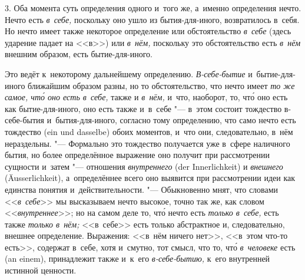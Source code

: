 3. Оба момента суть определения одного и~того же, а~именно определения
нечто. Нечто есть {\em в~себе,} поскольку оно ушло из
бытия-для-иного, возвратилось в~себя. Но нечто имеет также некоторое
определение или обстоятельство {\em в~себе} (здесь
ударение падает на <<в>>) или {\em в~нём,} поскольку это
обстоятельство есть {\em в~нём} внешним образом, есть
бытие-для-иного.

Это ведёт к~некоторому дальнейшему определению.
{\em В-себе-бытие} и~бытие-для-иного ближайшим
образом разны, но то обстоятельство, что нечто имеет
{\em то же самое, чт\'{о} оно есть в~себе,} также и {\em в~нём,} и~что,
наоборот, то,
чт\'{о} оно есть как бытие-для-иного, оно есть также и~в~себе "--- в~этом
состоит тождество в-себе-бытия и~бытия-для-иного, согласно тому
определению, что само нечто есть тождество (ein und dasselbe) обоих
моментов, и~что они, следовательно, в~нём нераздельны. "--- Формально это
тождество получается уже в~сфере наличного бытия, но более определённое
выражение оно получит при рассмотрении сущности и~затем "--- отношения
{\em внутреннего} (der Inner\-lich\-keit) и
{\em внешнего} (Äusser\-lich\-keit), а~определённее всего
оно выявится при рассмотрении идеи как единства понятия и~действительности.
"--- Обыкновенно мнят, что словами <<{\em в~себе}>> мы
высказываем нечто высокое, точно так же, как словом
<<{\em внутреннее}>>; но на самом деле то, чт\'{о} нечто есть
{\em только в~себе,} есть также {\em только в~нём;} <<в~себе>> есть только
абстрактное и, следовательно, внешнее определение. Выражения: <<в~нём
ничего нет>>, <<в~этом что-то есть>>, содержат в~себе, хотя и~смутно, тот
смысл, что то, чт\'{о} {\em в~человеке} есть (an einem), принадлежит также
и~к~его {\em в-себе-бытию,} к~его внутренней истинной ценности.

